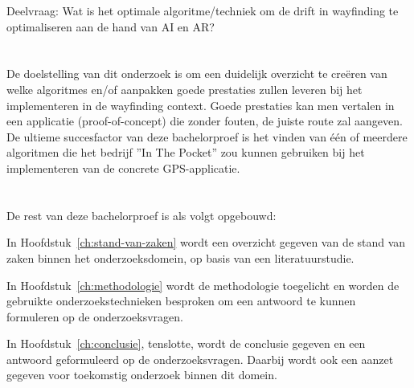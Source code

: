 Deelvraag: Wat is het optimale algoritme/techniek om de drift in wayfinding te optimaliseren aan de hand van AI en AR? 

\section{}
\label{sec:onderzoeksdoelstelling}

De doelstelling van dit onderzoek is om een duidelijk overzicht te creëren van welke algoritmes en/of aanpakken goede prestaties zullen leveren bij het implementeren in de wayfinding context. Goede prestaties kan men vertalen in een applicatie (proof-of-concept) die zonder fouten, de juiste route zal aangeven.
De ultieme succesfactor van deze bachelorproef is het vinden van één of meerdere algoritmen die het bedrijf ''In The Pocket'' zou kunnen gebruiken bij het implementeren van de concrete GPS-applicatie.



\section{}
\label{sec:opzet-bachelorproef}


De rest van deze bachelorproef is als volgt opgebouwd:

In Hoofdstuk~\ref{ch:stand-van-zaken} wordt een overzicht gegeven van de stand van zaken binnen het onderzoeksdomein, op basis van een literatuurstudie.

In Hoofdstuk~\ref{ch:methodologie} wordt de methodologie toegelicht en worden de gebruikte onderzoekstechnieken besproken om een antwoord te kunnen formuleren op de onderzoeksvragen.


In Hoofdstuk~\ref{ch:conclusie}, tenslotte, wordt de conclusie gegeven en een antwoord geformuleerd op de onderzoeksvragen. Daarbij wordt ook een aanzet gegeven voor toekomstig onderzoek binnen dit domein.